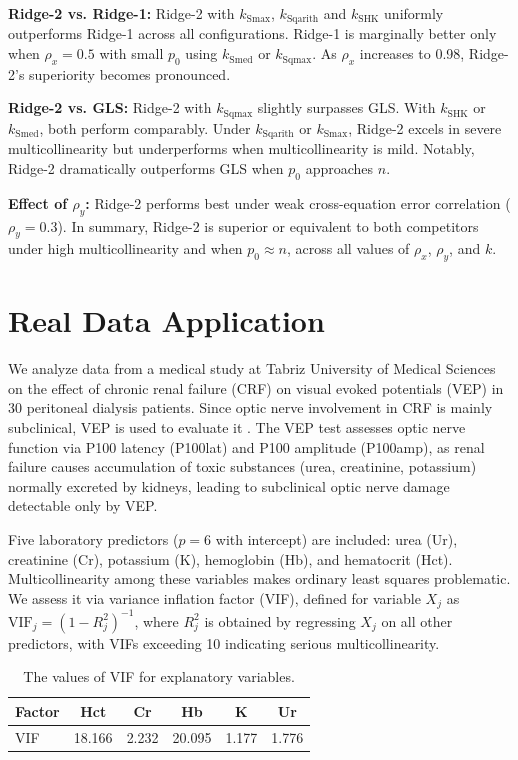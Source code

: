 \documentclass[twoside]{article}
\begin{document}
\textbf{Ridge-2 vs. Ridge-1:} Ridge-2 with $k_{\text{Smax}}$, $k_{\text{Sqarith}}$ and $k_{\text{SHK}}$ uniformly outperforms Ridge-1 across all configurations. Ridge-1 is marginally better only when $\rho_x = 0.5$ with small $p_0$ using $k_{\text{Smed}}$ or $k_{\text{Sqmax}}$. As $\rho_x$ increases to 0.98, Ridge-2's superiority becomes pronounced.

\textbf{Ridge-2 vs. GLS:} Ridge-2 with $k_{\text{Sqmax}}$ slightly surpasses GLS. With $k_{\text{SHK}}$ or $k_{\text{Smed}}$, both perform comparably. Under $k_{\text{Sqarith}}$ or $k_{\text{Smax}}$, Ridge-2 excels in severe multicollinearity but underperforms when multicollinearity is mild. Notably, Ridge-2 dramatically outperforms GLS when $p_0$ approaches $n$.

\textbf{Effect of $\rho_y$:} Ridge-2 performs best under weak cross-equation error correlation ($\rho_y = 0.3$). In summary, Ridge-2 is superior or equivalent to both competitors under high multicollinearity and when $p_0 \approx n$, across all values of $\rho_x$, $\rho_y$, and $k$.

\section{Real Data Application}
We analyze data from a medical study at Tabriz University of Medical Sciences on the effect of chronic renal failure (CRF) on visual evoked potentials (VEP) in 30 peritoneal dialysis patients. Since optic nerve involvement in CRF is mainly subclinical, VEP is used to evaluate it \cite{fraser1988, burn1998, brouns2004, lacerda2010}. The VEP test assesses optic nerve function via P100 latency (P100lat) and P100 amplitude (P100amp), as renal failure causes accumulation of toxic substances (urea, creatinine, potassium) normally excreted by kidneys, leading to subclinical optic nerve damage detectable only by VEP.

Five laboratory predictors ($p = 6$ with intercept) are included: urea (Ur), creatinine (Cr), potassium (K), hemoglobin (Hb), and hematocrit (Hct). Multicollinearity among these variables makes ordinary least squares problematic. We assess it via variance inflation factor (VIF), defined for variable $X_j$ as $\text{VIF}_j = (1 - R^2_j)^{-1}$, where $R^2_j$ is obtained by regressing $X_j$ on all other predictors, with VIFs exceeding 10 indicating serious multicollinearity.
\begin{table}[htbp]
\centering
\caption{The values of VIF for explanatory variables.}
\label{tab:vif}
\begin{tabular}{|l|c|c|c|c|c|}
\hline
Factor & Hct & Cr & Hb & K & Ur \\
\hline
VIF & 18.166 & 2.232 & 20.095 & 1.177 & 1.776 \\
\hline
\end{tabular}
\end{table}
\end{document}
